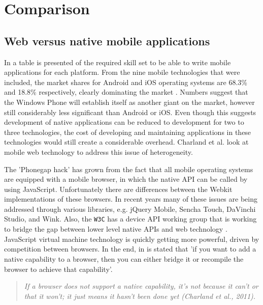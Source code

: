 \chapter{Comparison}\label{chapter:comparison}


\section{Web versus native mobile applications}

In \cite{Charland:2011:MAD:1941487.1941504} a table is presented of the required skill set to be able to write mobile applications for each platform. From the nine mobile technologies that were included, the market shares for Android and iOS operating systems are 68.3\% and 18.8\% respectively, clearly dominating the market \cite{Graziano:2012}. Numbers suggest that the Windows Phone will establish itself as another giant on the market, however still considerably less significant than Android or iOS. Even though this suggests development of native applications can be reduced to development for two to three technologies, the cost of developing and maintaining applications in these technologies would still create a considerable overhead. Charland et al. \cite{Charland:2011:MAD:1941487.1941504} look at mobile web technology to address this issue of heterogeneity.

The 'Phonegap hack' has grown from the fact that all mobile operating systems are equipped with a mobile browser, in which the native API can be called by using JavaScript. Unfortunately there are differences between the Webkit implementations of these browsers. In recent years many of these issues are being addressed through various libraries, e.g. jQuery Mobile, Sencha Touch, DaVinchi Studio, and Wink\cite{Charland:2011:MAD:1941487.1941504, mobpartner:2013}. Also, the \texttt{W3C} has a device API working group that is working to bridge the gap between lower level native APIs and web technology \cite{Charland:2011:MAD:1941487.1941504}. JavaScript virtual machine technology is quickly getting more powerful, driven by competition between browsers. In the end, in \cite{Charland:2011:MAD:1941487.1941504} is stated that 'if you want to add a native capability to a browser, then you can either bridge it or recompile the browser to achieve that capability'.

\begin{quotation}
	\textit{If a browser does not support a native capability, it's not because it can't or that it won't; it just means it hasn't been done yet (Charland et al., 2011).}
\end{quotation}


